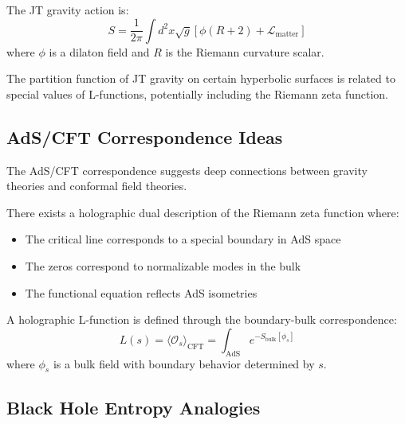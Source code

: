 \begin{definition}
\label{def:jt_action}
The JT gravity action is:
\begin{equation}
S = \frac{1}{2\pi} \int d^2x \sqrt{g} \left[ \phi (R + 2) + \mathcal{L}_{\text{matter}} \right]
\label{eq:jt_action}
\end{equation}
where $\phi$ is a dilaton field and $R$ is the Riemann curvature scalar.
\end{definition}

\begin{conjecture}
\label{conj:jt_zeta}
The partition function of JT gravity on certain hyperbolic surfaces is related to special values of L-functions, potentially including the Riemann zeta function.
\end{conjecture}

\subsection{AdS/CFT Correspondence Ideas}

The AdS/CFT correspondence suggests deep connections between gravity theories and conformal field theories.

\begin{hypothesis}
\label{hyp:ads_cft_rh}
There exists a holographic dual description of the Riemann zeta function where:
\begin{itemize}
\item The critical line corresponds to a special boundary in AdS space
\item The zeros correspond to normalizable modes in the bulk
\item The functional equation reflects AdS isometries
\end{itemize}
\end{hypothesis}

\begin{definition}
\label{def:holographic_l_function}
A holographic L-function is defined through the boundary-bulk correspondence:
\begin{equation}
L(s) = \langle \mathcal{O}_s \rangle_{\text{CFT}} = \int_{\text{AdS}} e^{-S_{\text{bulk}}[\phi_s]}
\label{eq:holographic_l_function}
\end{equation}
where $\phi_s$ is a bulk field with boundary behavior determined by $s$.
\end{definition}

\subsection{Black Hole Entropy Analogies}


